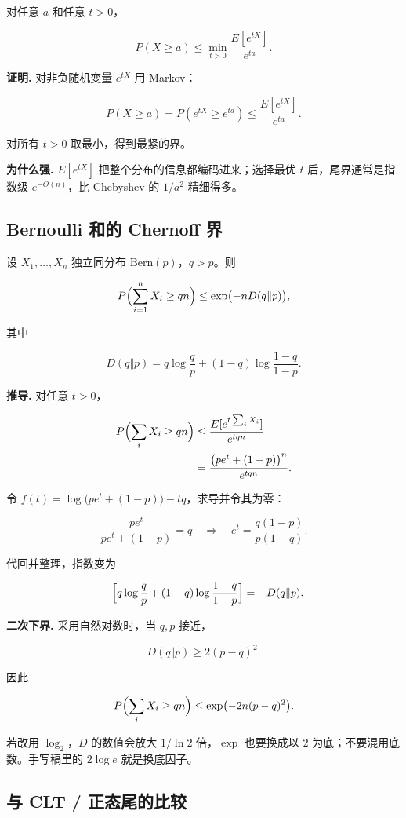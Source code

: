 对任意 $a$ 和任意 $t>0$，

\[
\boxed{
P(X\ge a)
\le\min_{t>0}\frac{E[e^{tX}]}{e^{ta}}
}.
\]

\textbf{证明.} 对非负随机变量 $e^{tX}$ 用 Markov：

\[
P(X\ge a)=P(e^{tX}\ge e^{ta})
\le\frac{E[e^{tX}]}{e^{ta}}.
\]

对所有 $t>0$ 取最小，得到最紧的界。

\textbf{为什么强.} $E[e^{tX}]$ 把整个分布的信息都编码进来；选择最优 $t$ 后，尾界通常是指数级 $e^{-\Theta(n)}$，比 Chebyshev 的 $1/a^2$ 精细得多。

\subsection{Bernoulli 和的 Chernoff 界}


设 $X_1,\dots,X_n$ 独立同分布 $\mathrm{Bern}(p)$，$q>p$。则

\[
P\Bigl(\sum_{i=1}^nX_i\ge qn\Bigr)
\le\exp\bigl(-nD(q\Vert p)\bigr),
\]

其中

\[
D(q\Vert p)
=q\log\frac qp+(1-q)\log\frac{1-q}{1-p}.
\]

\textbf{推导.} 对任意 $t>0$，

\[
\begin{aligned}
P\Bigl(\sum_iX_i\ge qn\Bigr)
&\le\frac{E[e^{t\sum_iX_i}]}{e^{tqn}}\\
&=\frac{\bigl(pe^t+(1-p)\bigr)^n}{e^{tqn}}.
\end{aligned}
\]

令 $f(t)=\log\bigl(pe^t+(1-p)\bigr)-tq$，求导并令其为零：

\[
\frac{pe^t}{pe^t+(1-p)}=q
\quad\Longrightarrow\quad
e^t=\frac{q(1-p)}{p(1-q)}.
\]

代回并整理，指数变为

\[
-\Bigl[q\log\frac qp+(1-q)\log\frac{1-q}{1-p}\Bigr]
=-D(q\Vert p).
\]

\textbf{二次下界.} 采用自然对数时，当 $q,p$ 接近，

\[
D(q\Vert p)\ge 2(p-q)^2.
\]

因此

\[
P\Bigl(\sum_iX_i\ge qn\Bigr)
\le\exp\bigl(-2n(p-q)^2\bigr).
\]

若改用 $\log_2$，$D$ 的数值会放大 $1/\ln2$ 倍，$\exp$ 也要换成以 $2$ 为底；不要混用底数。手写稿里的 $2\log e$ 就是换底因子。

\subsection{与 CLT / 正态尾的比较}



